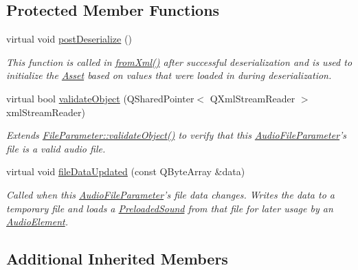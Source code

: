 \subsection*{Protected Member Functions}
\begin{DoxyCompactItemize}
\item 
virtual void \hyperlink{class_picto_1_1_audio_file_parameter_ad4e30ad3080b19a5dc73a38ff460ef95}{post\-Deserialize} ()
\begin{DoxyCompactList}\small\item\em This function is called in \hyperlink{class_picto_1_1_asset_a8bed4da09ecb1c07ce0dab313a9aba67}{from\-Xml()} after successful deserialization and is used to initialize the \hyperlink{class_picto_1_1_asset}{Asset} based on values that were loaded in during deserialization. \end{DoxyCompactList}\item 
\hypertarget{class_picto_1_1_audio_file_parameter_ab486817cbca0fd528df3d8fec0998bed}{virtual bool \hyperlink{class_picto_1_1_audio_file_parameter_ab486817cbca0fd528df3d8fec0998bed}{validate\-Object} (Q\-Shared\-Pointer$<$ Q\-Xml\-Stream\-Reader $>$ xml\-Stream\-Reader)}\label{class_picto_1_1_audio_file_parameter_ab486817cbca0fd528df3d8fec0998bed}

\begin{DoxyCompactList}\small\item\em Extends \hyperlink{class_picto_1_1_file_parameter_ac8e70960eed0516f77c731a415b364be}{File\-Parameter\-::validate\-Object()} to verify that this \hyperlink{class_picto_1_1_audio_file_parameter}{Audio\-File\-Parameter}'s file is a valid audio file. \end{DoxyCompactList}\item 
virtual void \hyperlink{class_picto_1_1_audio_file_parameter_a85de52a803276fad27d51286e822b349}{file\-Data\-Updated} (const Q\-Byte\-Array \&data)
\begin{DoxyCompactList}\small\item\em Called when this \hyperlink{class_picto_1_1_audio_file_parameter}{Audio\-File\-Parameter}'s file data changes. Writes the data to a temporary file and loads a \hyperlink{class_picto_1_1_preloaded_sound}{Preloaded\-Sound} from that file for later usage by an \hyperlink{class_picto_1_1_audio_element}{Audio\-Element}. \end{DoxyCompactList}\end{DoxyCompactItemize}
\subsection*{Additional Inherited Members}


